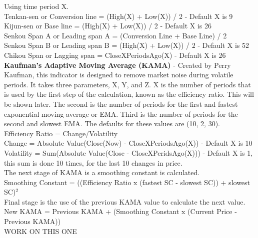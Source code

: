 \documentclass[12pt,a4paper]{article}
\begin{document}
\noindent
Using time period X.\\
Tenkan-sen or Conversion line = (High(X) + Low(X)) / 2  - Default X is 9 \\
Kijun-sen or Base line = (High(X) + Low(X)) / 2 - Default X is 26 \\
Senkou Span A or Leading span A = (Conversion Line + Base Line) / 2 \\
Senkou Span B or Leading span B = (High(X) + Low(X)) / 2 - Default X is 52 \\
Chikou Span or Lagging span = CloseXPeriodsAgo(X) - Default X is 26\\

\iffalse
[]
\fi

\noindent
\textbf{Kaufman's Adaptive Moving Average (KAMA)} - Created by Perry Kaufman, this indicator is designed to remove market noise during volatile periods. It takes three parameters, X, Y, and Z. X is the number of periods that is used by the first step of the calculation, known as the efficiency ratio. This will be shown later. The second is the number of periods for the first and fastest exponential moving average or EMA. Third is the number of periods for the second and slowest EMA. The defaults for these values are (10, 2, 30). \\

\noindent
Efficiency Ratio = Change/Volatility\\
Change = Absolute Value(Close(Now) - CloseXPeriodsAgo(X)) - Default X is 10 \\
Volatility = Sum(Absolute Value(Close - CloseXPeridsAgo(X))) - Default X is 1, this sum is done 10 times, for the last 10 changes in price.\\

\noindent
The next stage of KAMA is a smoothing constant is calculated. \\

\noindent
Smoothing Constant = ((Efficiency Ratio x (fastest SC - slowest SC)) + slowest SC)$^2$\\

\noindent
Final stage is the use of the previous KAMA value to calculate the next value. \\

\noindent
New KAMA = Previous KAMA + (Smoothing Constant x (Current Price - Previous KAMA))\\

WORK ON THIS ONE \\

\iffalse
[]
\fi
\end{document}

